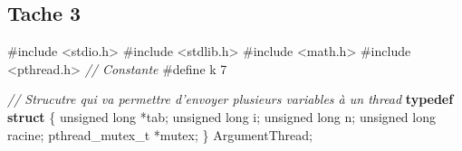 \documentclass[
    ]{article}
\newenvironment{Shaded}{}{}
\newcommand{\CommentTok}[1]{\textcolor[rgb]{0.38,0.63,0.69}{\textit{#1}}}
\newcommand{\DataTypeTok}[1]{\textcolor[rgb]{0.56,0.13,0.00}{#1}}
\newcommand{\ImportTok}[1]{#1}
\newcommand{\KeywordTok}[1]{\textcolor[rgb]{0.00,0.44,0.13}{\textbf{#1}}}
\newcommand{\NormalTok}[1]{#1}
\newcommand{\PreprocessorTok}[1]{\textcolor[rgb]{0.74,0.48,0.00}{#1}}
\begin{document}
\hypertarget{tache-3}{%
\subsection{Tache 3}\label{tache-3}}
\begin{Shaded}
\begin{Highlighting}[]
\PreprocessorTok{\#include }\ImportTok{\textless{}stdio.h\textgreater{}}
\PreprocessorTok{\#include }\ImportTok{\textless{}stdlib.h\textgreater{}}
\PreprocessorTok{\#include }\ImportTok{\textless{}math.h\textgreater{}}
\PreprocessorTok{\#include }\ImportTok{\textless{}pthread.h\textgreater{}}
\CommentTok{// Constante }
\PreprocessorTok{\#define k 7}

\CommentTok{// Strucutre qui va permettre d'envoyer plusieurs variables à un thread}
\KeywordTok{typedef} \KeywordTok{struct}
\NormalTok{\{}
    \DataTypeTok{unsigned} \DataTypeTok{long}\NormalTok{ *tab;}
    \DataTypeTok{unsigned} \DataTypeTok{long}\NormalTok{ i;}
    \DataTypeTok{unsigned} \DataTypeTok{long}\NormalTok{ n;}
    \DataTypeTok{unsigned} \DataTypeTok{long}\NormalTok{ racine;}
\NormalTok{    pthread\_mutex\_t *mutex;}
\NormalTok{\} ArgumentThread;}


\end{Highlighting}
\end{Shaded}
\end{document}

